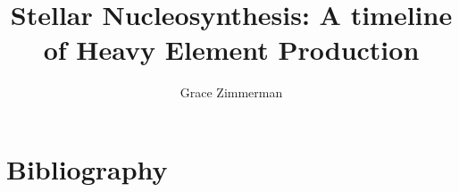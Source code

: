\documentclass{article}
\author{Grace Zimmerman}
\title{Stellar Nucleosynthesis: A timeline of Heavy Element Production}
\begin{document}
\maketitle





\section{Bibliography}



\end{document}
